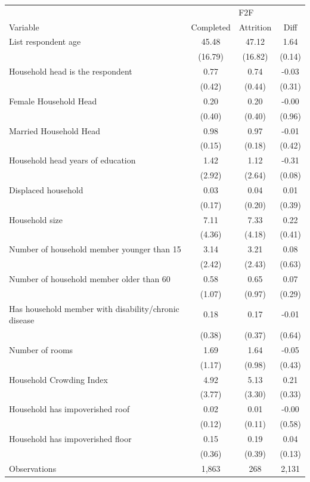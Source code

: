 \begin{tabular}{l*{3}c}
\hline\hline
 & \multicolumn{3}{c}{F2F}\\ 
Variable & Completed & Attrition & Diff \\
\hline
List respondent age&45.48&47.12&1.64\\
&(16.79)&(16.82)&(0.14)\\
Household head is the respondent&0.77&0.74&-0.03\\
&(0.42)&(0.44)&(0.31)\\
Female Household Head&0.20&0.20&-0.00\\
&(0.40)&(0.40)&(0.96)\\
Married Household Head&0.98&0.97&-0.01\\
&(0.15)&(0.18)&(0.42)\\
Household head years of education&1.42&1.12&-0.31\\
&(2.92)&(2.64)&(0.08)\\
Displaced household&0.03&0.04&0.01\\
&(0.17)&(0.20)&(0.39)\\
Household size&7.11&7.33&0.22\\
&(4.36)&(4.18)&(0.41)\\
Number of household member younger than 15&3.14&3.21&0.08\\
&(2.42)&(2.43)&(0.63)\\
Number of household member older than 60&0.58&0.65&0.07\\
&(1.07)&(0.97)&(0.29)\\
Has household member with disability/chronic disease&0.18&0.17&-0.01\\
&(0.38)&(0.37)&(0.64)\\
Number of rooms&1.69&1.64&-0.05\\
&(1.17)&(0.98)&(0.43)\\
Household Crowding Index&4.92&5.13&0.21\\
&(3.77)&(3.30)&(0.33)\\
Household has impoverished roof&0.02&0.01&-0.00\\
&(0.12)&(0.11)&(0.58)\\
Household has impoverished floor&0.15&0.19&0.04\\
&(0.36)&(0.39)&(0.13)\\
\hline
Observations & 1,863 & 268 & 2,131 \\
\hline\hline
\end{tabular}
